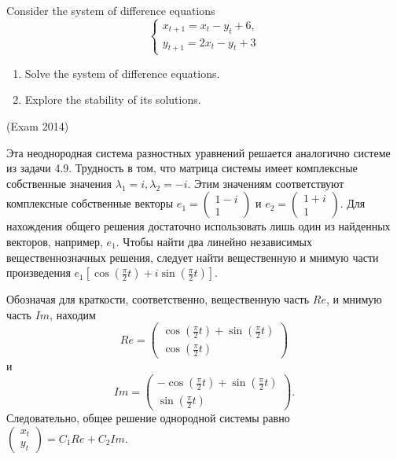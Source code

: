 \begin{problem}
Consider the system of difference equations
\[
\begin{cases}
 x_{t+1} =x_{t} -y_{t} +6, \\
 y_{t+1} =2x_{t} -y_{t} +3
\end{cases}
 \]

\begin{enumerate}
\item  Solve the system of difference equations.

\item  Explore the stability of its solutions.
\end{enumerate}

(Exam 2014)


\begin{sol}
Эта неоднородная система разностных уравнений решается  аналогично системе из задачи 4.9. Трудность в том, что матрица системы имеет комплексные собственные значения $\lambda _{1} =i, \lambda _{2} =-i$. Этим значениям соответствуют комплексные собственные векторы $e_{1} =\left(\begin{array}{c} {1-i} \\ {1} \end{array}\right)$ и $e_{2} =\left(\begin{array}{c} {1+i} \\ {1} \end{array}\right)$. Для нахождения общего решения достаточно использовать лишь один из найденных векторов, например, $e_{1} $. Чтобы найти два линейно независимых вещественнозначных решения, следует найти вещественную и мнимую части произведения $e_{1} \left[\cos (\frac{\pi }{2} t)+i\sin (\frac{\pi }{2} t)\right]$.

Обозначая для краткости, соответственно, вещественную часть $Re$, и мнимую часть $Im$, находим
\[
Re=\left(\begin{array}{c} {\cos (\frac{\pi }{2} t)+\sin (\frac{\pi }{2} t)} \\ {\cos (\frac{\pi }{2} t)} \end{array}\right)
\]
и
\[
Im=\left(\begin{array}{c} {-\cos (\frac{\pi }{2} t)+\sin (\frac{\pi }{2} t)} \\ {\sin (\frac{\pi }{2} t)} \end{array}\right).
\]
Следовательно, общее решение однородной системы равно $\left(\begin{array}{c} {x_{t} } \\ {y_{t} } \end{array}\right)=C_{1} Re+C_{2} Im$.



\end{sol}
\end{problem}
